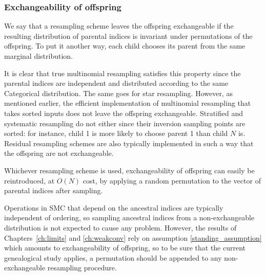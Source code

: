 %




\subsubsection{Exchangeability of offspring}
We say that a resampling scheme leaves the offspring exchangeable if the resulting distribution of parental indices is invariant under permutations of the offspring. To put it another way, each child chooses its parent from the same marginal distribution.

It is clear that true multinomial resampling satisfies this property since the parental indices are independent and distributed according to the same Categorical distribution. 
The same goes for star resampling. 
However, as mentioned earlier, the efficient implementation of multinomial resampling that takes sorted inputs does not leave the offspring exchangeable.
Stratified and systematic resampling do not either since their inversion sampling points are sorted: for instance, child 1 is more likely to choose parent 1 than child $N$ is.
Residual resampling schemes are also typically implemented in such a way that the offspring are not exchangeable.

Whichever resampling scheme is used, exchangeability of offspring can easily be reintroduced, at $O(N)$ cost, by applying a random permutation to the vector of parental indices after sampling.

Operations in SMC that depend on the ancestral indices are typically independent of ordering, so sampling ancestral indices from a non-exchangeable distribution is not expected to cause any problem.
However, the results of Chapters~\ref{ch:limits} and \ref{ch:weakconv} rely on assumption \ref{standing_assumption} which amounts to exchangeability of offspring, so to be sure that the current genealogical study applies, a permutation should be appended to any non-exchangeable resampling procedure.






